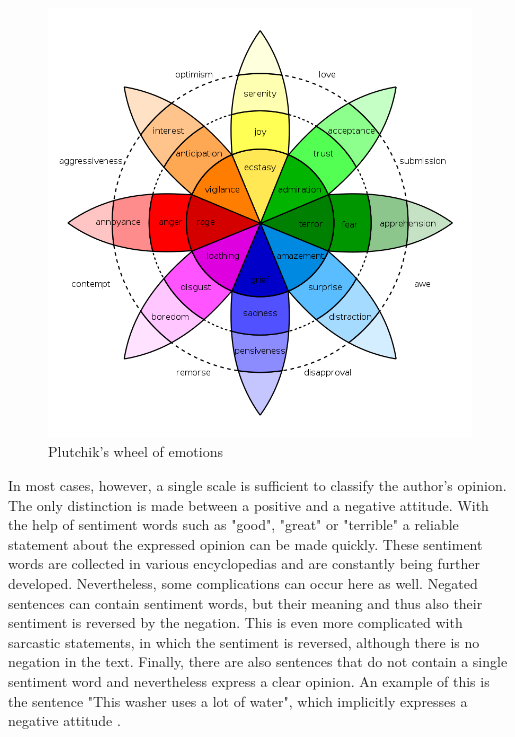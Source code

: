 \documentclass[article,type=msc,colorback,accentcolor=tud7b]{tudthesis}
\begin{document}
    \begin{figure}[H]
      \centering
      \includegraphics[scale=0.35]{images/plutchik_wheel}
      \caption[Plutchik's wheel of emotions]{Plutchik's wheel of emotions\protect\footnotemark}
      \label{fig:plutchik_wheel}
    \end{figure}
    
  
    In most cases, however, a single scale is sufficient to classify the author's opinion. The only distinction is made between a positive and a negative attitude. With the help of sentiment words such as "good", "great" or "terrible" a reliable statement about the expressed opinion can be made quickly. These sentiment words are collected in various encyclopedias and are constantly being further developed. Nevertheless, some complications can occur here as well.  Negated sentences can contain sentiment words, but their meaning and thus also their sentiment is reversed by the negation. This is even more complicated with sarcastic statements, in which the sentiment is reversed, although there is no negation in the text. Finally, there are also sentences that do not contain a single sentiment word and nevertheless express a clear opinion. An example of this is the sentence "This washer uses a lot of water", which implicitly expresses a negative attitude \autocite[section 1.2.2]{Liu2012}.  
\end{document}
